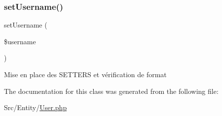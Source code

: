\mbox{\label{class_src_1_1_entity_1_1_user_ac359b701a2ccaff746dd480f03314244}} 
\subsubsection{\texorpdfstring{set\+Username()}{setUsername()}}
{\footnotesize\ttfamily set\+Username (\begin{DoxyParamCaption}\item[{}]{\$username }\end{DoxyParamCaption})}

Mise en place des S\+E\+T\+T\+E\+RS et vérification de format 

The documentation for this class was generated from the following file\+:\begin{DoxyCompactItemize}
\item 
Src/\+Entity/\hyperlink{_user_8php}{User.\+php}\end{DoxyCompactItemize}
